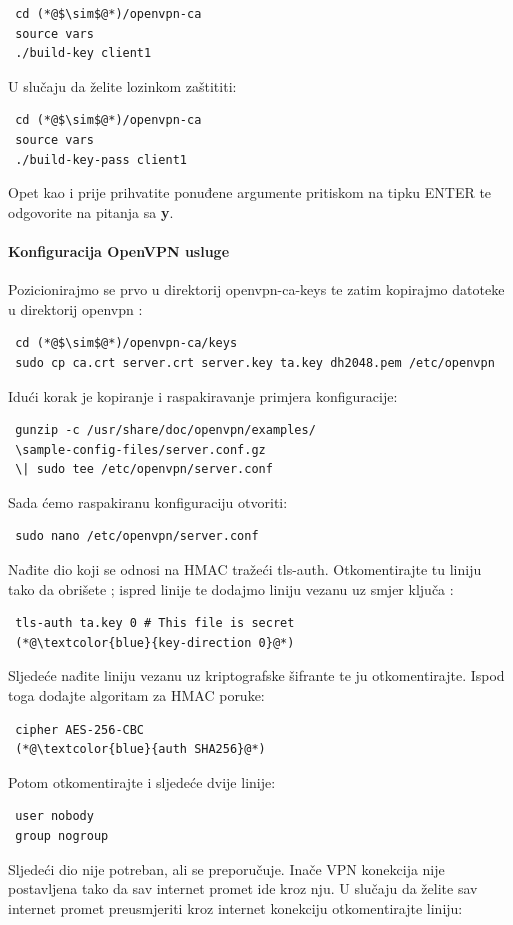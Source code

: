 \begin{lstlisting}
 cd (*@$\sim$@*)/openvpn-ca
 source vars
 ./build-key client1
\end{lstlisting}
U slučaju da želite lozinkom zaštititi:  
\begin{lstlisting}
 cd (*@$\sim$@*)/openvpn-ca
 source vars
 ./build-key-pass client1
\end{lstlisting}
Opet kao i prije prihvatite ponuđene argumente pritiskom na tipku ENTER te odgovorite na pitanja sa \textbf{y}.
\bigbreak
\paragraph*{Konfiguracija OpenVPN usluge}
\hfill \smallbreak
Pozicionirajmo se prvo u direktorij openvpn-ca-keys te zatim kopirajmo datoteke u direktorij openvpn :
\begin{lstlisting}
 cd (*@$\sim$@*)/openvpn-ca/keys
 sudo cp ca.crt server.crt server.key ta.key dh2048.pem /etc/openvpn
\end{lstlisting}
Idući korak je kopiranje i raspakiravanje primjera konfiguracije:
\begin{lstlisting}
 gunzip -c /usr/share/doc/openvpn/examples/
 \sample-config-files/server.conf.gz 
 \| sudo tee /etc/openvpn/server.conf
\end{lstlisting}
Sada ćemo raspakiranu konfiguraciju otvoriti:
\begin{lstlisting}
 sudo nano /etc/openvpn/server.conf
\end{lstlisting}
Nađite dio koji se odnosi na HMAC tražeći tls-auth. Otkomentirajte tu liniju tako da obrišete ; ispred linije te dodajmo liniju vezanu uz smjer ključa : 
\begin{lstlisting}
 tls-auth ta.key 0 # This file is secret
 (*@\textcolor{blue}{key-direction 0}@*)
\end{lstlisting}
Sljedeće nađite liniju vezanu uz kriptografske šifrante  te ju otkomentirajte. Ispod toga dodajte algoritam za HMAC poruke:
\begin{lstlisting}
 cipher AES-256-CBC
 (*@\textcolor{blue}{auth SHA256}@*)
\end{lstlisting}
Potom otkomentirajte i sljedeće dvije linije:
\begin{lstlisting}
 user nobody
 group nogroup
\end{lstlisting}
Sljedeći dio nije potreban, ali se preporučuje. Inače VPN konekcija nije postavljena tako da sav internet promet ide kroz nju. U slučaju da želite sav internet promet preusmjeriti kroz internet konekciju otkomentirajte liniju:
